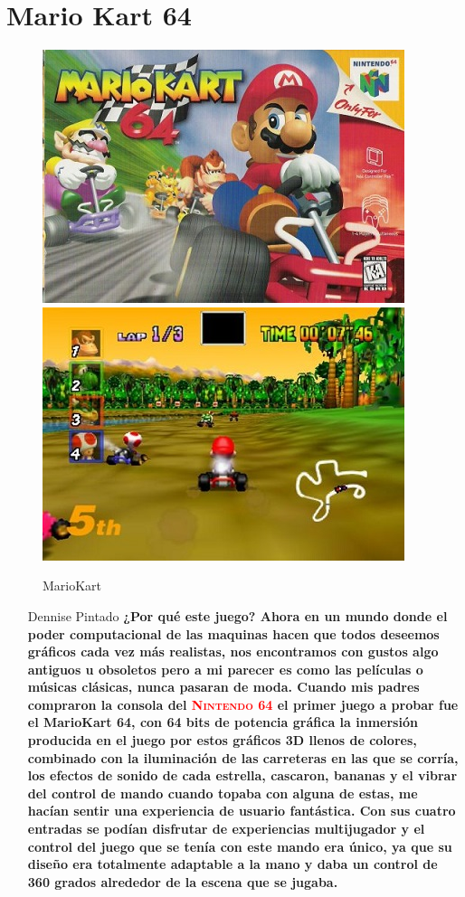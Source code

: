 \section{Mario Kart 64}

\begin{figure}[htbp]

\includegraphics[width=.60\textwidth]{./imagenes/kart1.jpg} \includegraphics[width=.60\textwidth]{./imagenes/kart2.jpg} 
\caption{MarioKart}
\label{Mario Kart}

\end{figure}


\pagecolor{cyan}
\begin{itemize}
\item[Dennise Pintado] \textbf {¿Por qué este juego? \textnormal {Ahora en un mundo donde el poder computacional de las maquinas hacen que todos deseemos  gráficos cada vez más realistas, nos encontramos con gustos algo antiguos u obsoletos pero a mi parecer es como las películas o músicas clásicas, nunca pasaran de moda. Cuando mis padres compraron la consola del  \textcolor{red}{\textsc{Nintendo 64}}} \textnormal {el primer juego a probar fue el MarioKart 64,  con  64 bits de potencia gráfica la inmersión producida en el juego  por estos gráficos 3D llenos de colores, combinado con la iluminación de las carreteras en las que se corría, los efectos de sonido de cada estrella, cascaron, bananas  y el vibrar del control de mando cuando topaba con alguna de estas, me hacían sentir una experiencia de usuario fantástica. Con sus cuatro entradas se podían disfrutar de experiencias multijugador y el  control del juego que se tenía con este  mando era único, ya que su diseño era totalmente adaptable a la mano y daba un control de 360 grados alrededor de la escena que se jugaba.}}  
\end{itemize}